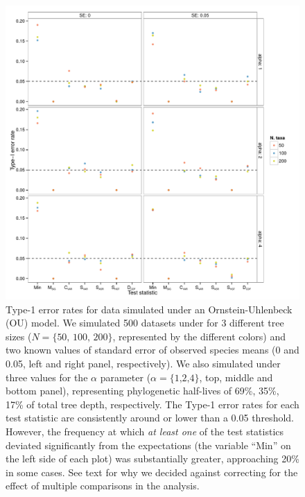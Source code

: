 \begin{figure}[p]
  \centering
  \includegraphics[width=\textwidth]{figs/ou-sim-res}
  \caption[Type-1 error rates for OU simulations]{Type-1 error rates for data simulated under an Ornstein-Uhlenbeck (OU) model. We simulated 500 datasets under for 3 different tree sizes ($N=\lbrace \text{50, 100, 200} \rbrace$, represented by the different colors) and two known values of standard error of observed species means (0 and 0.05, left and right panel, respectively). We also simulated under three values for the $\alpha$ parameter ($\alpha=\lbrace \text{1,2,4} \rbrace$, top, middle and bottom panel), representing phylogenetic half-lives of 69\%, 35\%, 17\% of total tree depth, respectively.  The Type-1 error rates for each test statistic are consistently around or lower than a 0.05 threshold. However, the frequency at which \emph{at least one} of the test statistics deviated significantly from the expectations (the variable ``Min'' on the left side of each plot) was substantially greater, approaching 20\% in some cases. See text for why we decided against correcting for the effect of multiple comparisons in the analysis.}
  \label{fig:ou-sim}
\end{figure}

